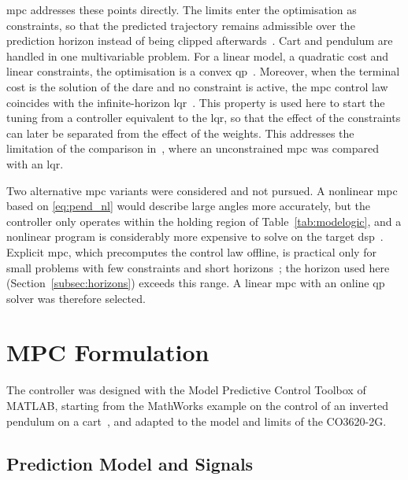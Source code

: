 \ac{mpc} addresses these points directly. The limits enter the optimisation
as constraints, so that the predicted trajectory remains admissible over the
prediction horizon instead of being clipped afterwards~\cite{rawlings2000}.
Cart and pendulum are handled in one multivariable problem. For a linear
model, a quadratic cost and linear constraints, the optimisation is a convex \ac{qp}~\cite{rawlings2000}. Moreover, when the terminal
cost is the solution of the \acf{dare} and no constraint is active, the \ac{mpc} control law coincides
with the infinite-horizon \ac{lqr}~\cite{rawlings2000}. This property is
used here to start the tuning from a controller equivalent to the
\ac{lqr}, so that the effect of the constraints can later be separated from
the effect of the weights. This addresses the limitation of the comparison
in~\cite{minouchehr2015}, where an unconstrained \ac{mpc} was compared with an
\ac{lqr}.

Two alternative \ac{mpc} variants were considered and not pursued.
A nonlinear \ac{mpc} based on \eqref{eq:pend_nl} would describe large angles
more accurately, but the controller only operates within the holding region of
Table~\ref{tab:modelogic}, and a nonlinear program is considerably more
expensive to solve on the target \ac{dsp}~\cite{rawlings2000}. Explicit
\ac{mpc}, which precomputes the control law offline, is practical only for
small problems with few constraints and short horizons~\cite{wang2010}; the
horizon used here (Section~\ref{subsec:horizons}) exceeds this range. A linear
\ac{mpc} with an online \ac{qp} solver was therefore selected.

\section{MPC Formulation}
\label{sec:mpc}

The controller was designed with the Model Predictive Control Toolbox of
MATLAB, starting from the MathWorks example on the control of an inverted
pendulum on a cart~\cite{mathworks_pendcart}, and adapted to the model and
limits of the CO3620-2G.

\subsection{Prediction Model and Signals}
\label{subsec:predmodel}

